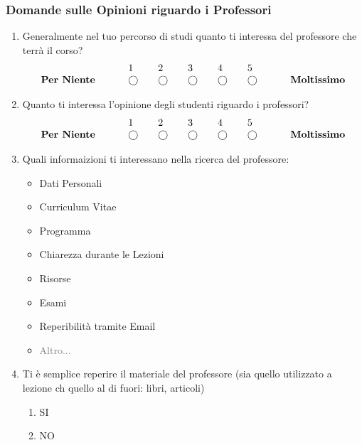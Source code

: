 \subsubsection{Domande sulle Opinioni riguardo i Professori}
\begin{enumerate}
    \item Generalmente nel tuo percorso di studi quanto ti interessa del professore che terrà il corso?
    \begin{equation*}
        \begin{array}{lllllll}
                        &  1 & 2 & 3 & 4 & 5 & \\
    \text { \textbf{Per Niente} } \quad \quad & \bigcirc \quad& \bigcirc \quad& \bigcirc \quad& \bigcirc \quad& \bigcirc \quad& \quad \text { \textbf{Moltissimo} }
        \end{array}
    \end{equation*}

    \item Quanto ti interessa l'opinione degli studenti riguardo i professori?
    \begin{equation*}
        \begin{array}{lllllll}
                        &  1 & 2 & 3 & 4 & 5 & \\
    \text { \textbf{Per Niente} } \quad \quad & \bigcirc \quad& \bigcirc \quad& \bigcirc \quad& \bigcirc \quad& \bigcirc \quad& \quad \text { \textbf{Moltissimo} }
        \end{array}
    \end{equation*}

    \item Quali informaizioni ti interessano nella ricerca del professore:
    \begin{itemize}
        \item Dati Personali 
        \item Curriculum Vitae
        \item Programma
        \item Chiarezza durante le Lezioni
        \item Risorse
        \item Esami
        \item Reperibilità tramite Email
        \item \textcolor{gray}{Altro...}
    \end{itemize}

    \item Ti è semplice reperire il materiale del professore (sia quello utilizzato a lezione ch quello al di fuori: libri, articoli)
    \begin{enumerate}
        \item SI
        \item NO
    \end{enumerate}


\end{enumerate}
